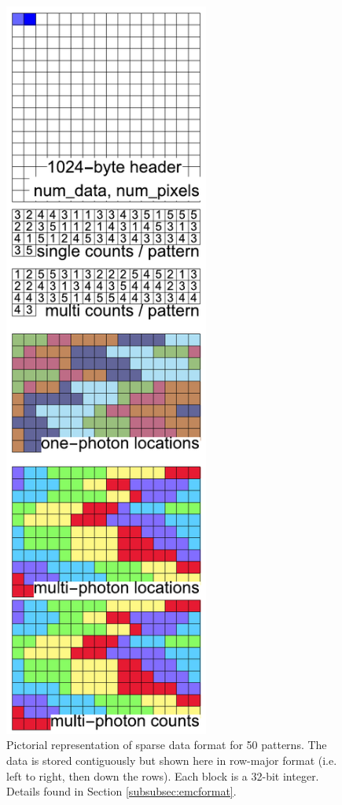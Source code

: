 \documentclass[]{iucr}              %
\begin{document}
\begin{figure}
\caption{Pictorial representation of sparse data format for 50 patterns. The data is stored contiguously but shown here in row-major format (i.e. left to right, then down the rows). Each block is a 32-bit integer. Details found in Section \ref{subsubsec:emcformat}.}\label{fig:dataFormat}
\includegraphics[width=0.6\textwidth]{figures/dataFormat}
\end{figure}
\end{document}
